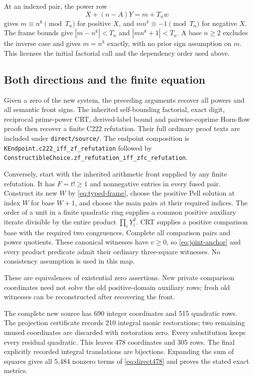 At an indexed pair, the power row
\[
 X+(n-A)Y=m+T_nw
\]
gives $m\equiv n^k\pmod{T_n}$ for positive $X$, and
$mn^k\equiv-1\pmod{T_n}$ for negative $X$.  The frame bounds give
$|m-n^k|<T_n$ and $|mn^k+1|<T_n$.  A base $n\ge2$ excludes the
inverse case and gives $m=n^k$ exactly, with no prior sign assumption
on $m$.  This licenses the initial factorial call and the dependency order
used above.

\subsection{Both directions and the finite equation}

Given a zero of the new system, the preceding arguments recover all powers
and all semantic front signs.  The inherited self-bounding factorial,
exact digit, reciprocal prime-power CRT, derived-label bound and
pairwise-coprime Horn-flow proofs then recover a finite C222 refutation.
Their full ordinary proof texts are included under \texttt{direct/source/}.
The endpoint composition is
\texttt{KEndpoint.c222\_iff\_zf\_refutation} followed by
\texttt{ConstructibleChoice.zf\_refutation\_iff\_zfc\_refutation}.

Conversely, start with the inherited arithmetic front supplied by any
finite refutation.  It has $F=t!\ge1$ and nonnegative entries in every
fused pair.  Construct its new $W$ by \eqref{eq:typed-frame}, choose the
positive Pell solution at index $W$ for base $W+1$, and choose the main
pairs at their required indices.  The order of a unit in a finite
quadratic ring supplies a common positive auxiliary iterate divisible by
the entire product $\prod_iY_i^2$.  CRT supplies a positive comparison
base with the required two congruences.  Complete all comparison pairs
and power quotients.  These canonical witnesses have $v\ge0$, so
\eqref{eq:joint-anchor} and every product predicate admit their ordinary
three-square witnesses.  No consistency assumption is used in this map.

These are equivalences of existential zero assertions.  New private
comparison coordinates need not solve the old positive-domain auxiliary
rows; fresh old witnesses can be reconstructed after recovering the front.

The complete new source has 690 integer coordinates and 515 quadratic
rows.  The projection certificate records 210 integral monic restorations;
two remaining unused coordinates are discarded with restoration zero.
Every substitution keeps every residual quadratic.  This leaves 478
coordinates and 305 rows.  The final explicitly recorded integral
translations are bijections.  Expanding the sum of squares gives all 5,484
nonzero terms of \eqref{eq:direct478} and proves the stated exact metrics.

